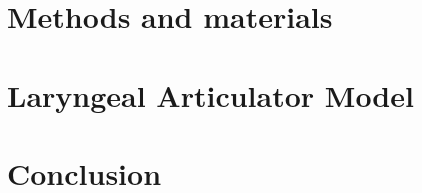 \documentclass[12pt, letterpaper]{article}
\begin{document}
\section{Methods and materials} \label{sec:Methods}



\section{Laryngeal Articulator Model} \label{sec:LAM}



\section{Conclusion} \label{sec:Conclusion}




\printbibliography[heading=bibintoc]
\end{document}
